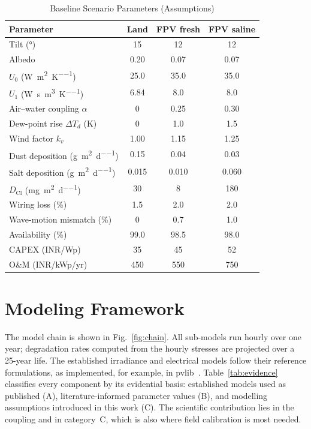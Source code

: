 \documentclass[journal]{IEEEtran}
\begin{document}
\begin{table}[!t]
\caption{Baseline Scenario Parameters (Assumptions)}
\label{tab:params}
\centering
\footnotesize
\setlength{\tabcolsep}{3.5pt}
\begin{tabular}{@{}lccc@{}}
\toprule
Parameter & Land & FPV fresh & FPV saline \\
\midrule
Tilt (\si{\degree}) & 15 & 12 & 12 \\
Albedo & 0.20 & 0.07 & 0.07 \\
$U_0$ (\si{\watt\per\square\metre\per\kelvin}) & 25.0 & 35.0 & 35.0 \\
$U_1$ (\si{\watt\second\per\cubic\metre\per\kelvin}) & 6.84 & 8.0 & 8.0 \\
Air--water coupling $\alpha$ & 0 & 0.25 & 0.30 \\
Dew-point rise $\Delta T_d$ (K) & 0 & 1.0 & 1.5 \\
Wind factor $k_v$ & 1.00 & 1.15 & 1.25 \\
Dust deposition (\si{\gram\per\square\metre\per\day}) & 0.15 & 0.04 & 0.03 \\
Salt deposition (\si{\gram\per\square\metre\per\day}) & 0.015 & 0.010 & 0.060 \\
$D_{\mathrm{Cl}}$ (\si{\milli\gram\per\square\metre\per\day}) & 30 & 8 & 180 \\
Wiring loss (\%) & 1.5 & 2.0 & 2.0 \\
Wave-motion mismatch (\%) & 0 & 0.7 & 1.0 \\
Availability (\%) & 99.0 & 98.5 & 98.0 \\
CAPEX (INR/Wp) & 35 & 45 & 52 \\
O\&M (INR/kWp/yr) & 450 & 550 & 750 \\
\bottomrule
\end{tabular}
\end{table}

\section{Modeling Framework}\label{sec:model}

The model chain is shown in Fig.~\ref{fig:chain}. All sub-models run hourly over one year; degradation rates computed
from the hourly stresses are projected over a 25-year life. The established irradiance and electrical models follow
their reference formulations, as implemented, for example, in pvlib~\cite{holmgren2018}. Table~\ref{tab:evidence}
classifies every component by its evidential basis: established models used as published (A), literature-informed
parameter values (B), and modelling assumptions introduced in this work (C). The scientific contribution lies in the
coupling and in category~C, which is also where field calibration is most needed.
\end{document}

